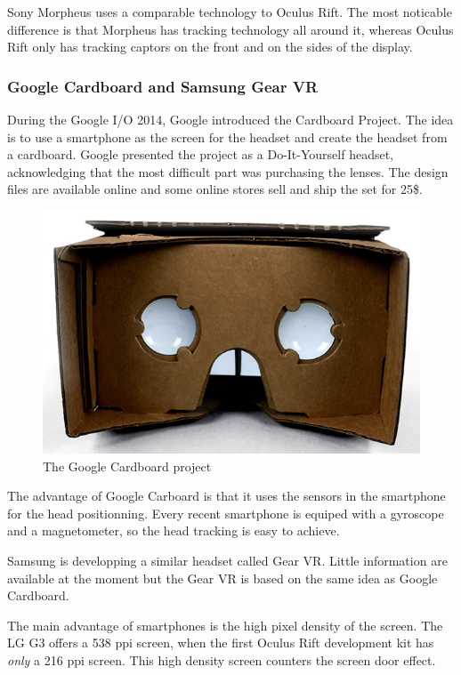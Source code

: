 \documentclass[12pt]{article}
\begin{document}
Sony Morpheus uses a comparable technology to Oculus Rift. The most noticable difference is that Morpheus has tracking technology all around it, whereas Oculus Rift only has tracking captors on the front and on the sides of the display.

\subsubsection{Google Cardboard and Samsung Gear VR}
During the Google I/O 2014, Google introduced the Cardboard Project. The idea is to use a smartphone as the screen for the headset and create the headset from a cardboard. Google presented the project as a Do-It-Yourself headset, acknowledging that the most difficult part was purchasing the lenses. The design files are available online and some online stores sell and ship the set for 25\$.

\begin{figure}[h]
  \centering
  \includegraphics[scale=0.3]{GoogleCardboard.png}
  \caption{\label{cardboard} The Google Cardboard project}
\end{figure}

The advantage of Google Carboard is that it uses the sensors in the smartphone for the head positionning. Every recent smartphone is equiped with a gyroscope and a magnetometer, so the head tracking is easy to achieve.

Samsung is developping a similar headset called Gear VR. Little information are available at the moment but the Gear VR is based on the same idea as Google Cardboard.

The main advantage of smartphones is the high pixel density of the screen. The LG G3 offers a 538 ppi screen, when the first Oculus Rift development kit has \textit{only} a 216 ppi screen. This high density screen counters the screen door effect.
\end{document}
